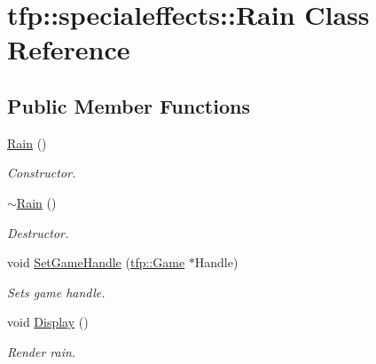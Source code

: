 \hypertarget{classtfp_1_1specialeffects_1_1_rain}{}\section{tfp\+:\+:specialeffects\+:\+:Rain Class Reference}
\label{classtfp_1_1specialeffects_1_1_rain}
\subsection*{Public Member Functions}
\begin{DoxyCompactItemize}
\item 
\mbox{\label{classtfp_1_1specialeffects_1_1_rain_ab9fbf8d201b9f71d40d6a0c2a3effe22}} 
\mbox{\hyperlink{classtfp_1_1specialeffects_1_1_rain_ab9fbf8d201b9f71d40d6a0c2a3effe22}{Rain}} ()
\begin{DoxyCompactList}\small\item\em Constructor. \end{DoxyCompactList}\item 
\mbox{\label{classtfp_1_1specialeffects_1_1_rain_acdac171c8522ef034f94413ba181771f}} 
\mbox{\hyperlink{classtfp_1_1specialeffects_1_1_rain_acdac171c8522ef034f94413ba181771f}{$\sim$\+Rain}} ()
\begin{DoxyCompactList}\small\item\em Destructor. \end{DoxyCompactList}\item 
\mbox{\label{classtfp_1_1specialeffects_1_1_rain_ac317a6cfc99d95a3dc53e85f0b0e4d69}} 
void \mbox{\hyperlink{classtfp_1_1specialeffects_1_1_rain_ac317a6cfc99d95a3dc53e85f0b0e4d69}{Set\+Game\+Handle}} (\mbox{\hyperlink{classtfp_1_1_game}{tfp\+::\+Game}} $\ast$Handle)
\begin{DoxyCompactList}\small\item\em Sets game handle. \end{DoxyCompactList}\item 
void \mbox{\hyperlink{classtfp_1_1specialeffects_1_1_rain_a5a0baf62d50003eda4af4da3ebb0f0ee}{Display}} ()
\begin{DoxyCompactList}\small\item\em Render rain. \end{DoxyCompactList}\item 

\end{DoxyCompactItemize}

